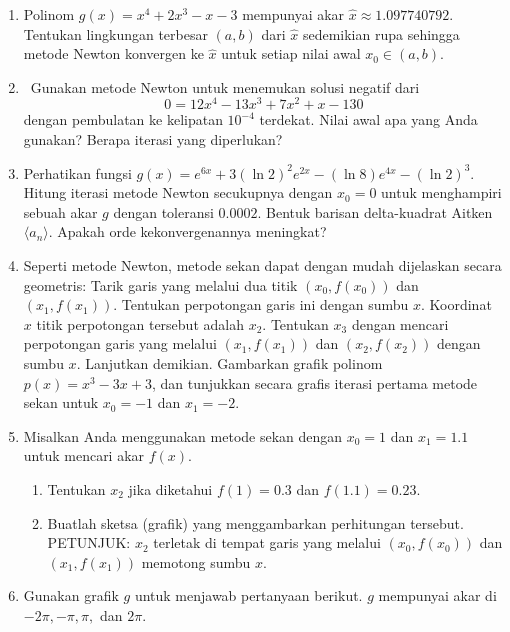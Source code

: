 \begin{enumerate}
ini.
\item \label{exc:newton-6}Polinom $g(x)=x^{4}+2x^{3}-x-3$ mempunyai akar
$\hat{x}\approx1.097740792$. Tentukan lingkungan terbesar $(a,b)$
dari $\hat{x}$ sedemikian rupa sehingga metode Newton konvergen ke
$\hat{x}$ untuk setiap nilai awal $x_{0}\in(a,b)$.  \hasasolution 
\item \octave\ Gunakan metode Newton untuk menemukan solusi negatif dari
\[
0=12x^{4}-13x^{3}+7x^{2}+x-130
\]
dengan pembulatan ke kelipatan $10^{-4}$ terdekat. Nilai awal apa
yang Anda gunakan? Berapa iterasi yang diperlukan?
\item \label{exc:newton-7}Perhatikan fungsi $g(x)=e^{6x}+3(\ln2)^{2}e^{2x}-(\ln8)e^{4x}-(\ln2)^{3}$.
Hitung iterasi metode Newton secukupnya dengan $x_{0}=0$ untuk menghampiri
sebuah akar $g$ dengan toleransi $0.0002$. Bentuk barisan delta-kuadrat
Aitken $\langle a_{n}\rangle$. Apakah orde kekonvergenannya meningkat? \hasananswer 
\item \label{exc:newton-8}Seperti metode Newton, metode sekan dapat dengan
mudah dijelaskan secara geometris: Tarik garis yang melalui dua titik
$(x_{0},f(x_{0}))$ dan $(x_{1},f(x_{1}))$. Tentukan perpotongan
garis ini dengan sumbu $x$. Koordinat $x$ titik perpotongan tersebut
adalah $x_{2}$. Tentukan $x_{3}$ dengan mencari perpotongan garis
yang melalui $(x_{1},f(x_{1}))$ dan $(x_{2},f(x_{2}))$ dengan sumbu
$x$. Lanjutkan demikian. Gambarkan grafik polinom $p(x)=x^{3}-3x+3$,
dan tunjukkan secara grafis iterasi pertama metode sekan untuk $x_{0}=-1$
dan $x_{1}=-2$.  \hasasolution 
\item Misalkan Anda menggunakan metode sekan dengan $x_{0}=1$ dan $x_{1}=1.1$
untuk mencari akar $f(x)$. 

\begin{enumerate}
\item Tentukan $x_{2}$ jika diketahui $f(1)=0.3$ dan $f(1.1)=0.23$.
\item Buatlah sketsa (grafik) yang menggambarkan perhitungan tersebut. PETUNJUK:
$x_{2}$ terletak di tempat garis yang melalui $(x_{0},f(x_{0}))$
dan $(x_{1},f(x_{1}))$ memotong sumbu $x$.
\end{enumerate}
\item \label{exc:newton-9}Gunakan grafik $g$ untuk menjawab pertanyaan
berikut. $g$ mempunyai akar di $-2\pi,-\pi,\pi,$ dan $2\pi$.  \hasananswer 


\end{enumerate}
